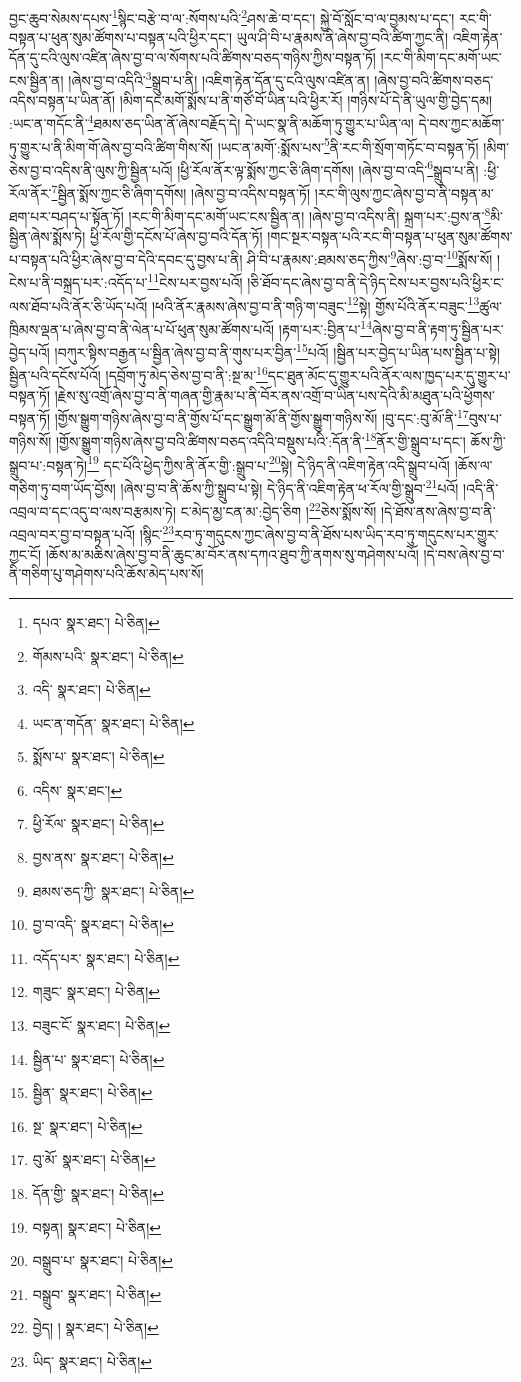 བྱང་ཆུབ་སེམས་དཔས་\footnote{དཔའ་  སྣར་ཐང་།  པེ་ཅིན། }སྙིང་བརྩེ་བ་ལ་:སོགས་པའི་\footnote{གོམས་པའི་  སྣར་ཐང་།  པེ་ཅིན། }ཤས་ཆེ་བ་དང་། སྐྱེ་བོ་སློང་བ་ལ་བྱམས་པ་དང་། རང་གི་བསྟན་པ་ཕུན་སུམ་ཚོགས་པ་བསྟན་པའི་ཕྱིར་དང་། ཡུལ་ཤི་བི་པ་རྣམས་ནི་ཞེས་བྱ་བའི་ཚིག་ཀྱང་ནི། འཇིག་རྟེན་དོན་དུ་ངའི་ལུས་འཛིན་ཞེས་བྱ་བ་ལ་སོགས་པའི་ཚིགས་བཅད་གཉིས་ཀྱིས་བསྟན་ཏོ། །རང་གི་མིག་དང་མགོ་ཡང་ངས་སྦྱིན་ན། །ཞེས་བྱ་བ་འདིའི་\footnote{འདི་  སྣར་ཐང་།  པེ་ཅིན། }སྒྲུབ་པ་ནི། །འཇིག་རྟེན་དོན་དུ་ངའི་ལུས་འཛིན་ན། །ཞེས་བྱ་བའི་ཚིགས་བཅད་འདིས་བསྟན་པ་ཡིན་ནོ། །མིག་དང་མགོ་སྨོས་པ་ནི་གཙོ་བོ་ཡིན་པའི་ཕྱིར་རོ། །གཉིས་པོ་དེ་ནི་ཡུལ་གྱི་བྱེད་དམ། :ཡང་ན་གདོང་ནི་\footnote{ཡང་ན་གདོན་  སྣར་ཐང་།  པེ་ཅིན། }ཐམས་ཅད་ཡིན་ནོ་ཞེས་བརྗོད་དེ། དེ་ཡང་སྣ་ནི་མཆོག་ཏུ་གྱུར་པ་ཡིན་ལ། དེ་བས་ཀྱང་མཆོག་ཏུ་གྱུར་པ་ནི་མིག་གོ་ཞེས་བྱ་བའི་ཚིག་གིས་སོ། །ཡང་ན་མགོ་:སྨོས་པས་\footnote{སྨོས་པ་  སྣར་ཐང་།  པེ་ཅིན། }ནི་རང་གི་སྲོག་གཏོང་བ་བསྟན་ཏོ། །མིག་ཅེས་བྱ་བ་འདིས་ནི་ལུས་ཀྱི་སྦྱིན་པའོ། །ཕྱི་རོལ་ནོར་ལྟ་སྨོས་ཀྱང་ཅི་ཞིག་དགོས། །ཞེས་བྱ་བ་འདི་\footnote{འདིས་  སྣར་ཐང་། }སྒྲུབ་པ་ནི། :ཕྱི་རོལ་ནོར་\footnote{ཕྱི་རོལ་  སྣར་ཐང་།  པེ་ཅིན། }སྦྱིན་སྨོས་ཀྱང་ཅི་ཞིག་དགོས། །ཞེས་བྱ་བ་འདིས་བསྟན་ཏོ། །རང་གི་ལུས་ཀྱང་ཞེས་བྱ་བ་ནི་བསྟན་མ་ཐག་པར་བཤད་པ་སྟོན་ཏོ། །རང་གི་མིག་དང་མགོ་ཡང་ངས་སྦྱིན་ན། །ཞེས་བྱ་བ་འདིས་ནི། སྐྲག་པར་:བྱས་ན་\footnote{བྱས་ནས་  སྣར་ཐང་།  པེ་ཅིན། }མི་སྦྱིན་ཞེས་སྨོས་ཏེ། ཕྱི་རོལ་གྱི་དངོས་པོ་ཞེས་བྱ་བའི་དོན་ཏོ། །གང་སྔར་བསྟན་པའི་རང་གི་བསྟན་པ་ཕུན་སུམ་ཚོགས་པ་བསྟན་པའི་ཕྱིར་ཞེས་བྱ་བ་དེའི་དབང་དུ་བྱས་པ་ནི། ཤི་བི་པ་རྣམས་:ཐམས་ཅད་ཀྱིས་\footnote{ཐམས་ཅད་ཀྱི་  སྣར་ཐང་།  པེ་ཅིན། }ཞེས་:བྱ་བ་\footnote{བྱ་བ་འདི་  སྣར་ཐང་།  པེ་ཅིན། }སྨོས་སོ། །ངེས་པ་ནི་བསྐྲད་པར་:འདོད་པ་\footnote{འདོད་པར་  སྣར་ཐང་།  པེ་ཅིན། }ངེས་པར་བྱས་པའོ། །ཅི་ཐོབ་དང་ཞེས་བྱ་བ་ནི་དེ་ཉིད་ངེས་པར་བྱས་པའི་ཕྱིར་ང་ལས་ཐོབ་པའི་ནོར་ཅི་ཡོད་པའོ། །ཕའི་ནོར་རྣམས་ཞེས་བྱ་བ་ནི་གཉི་ག་བཟུང་\footnote{གཟུང་  སྣར་ཐང་།  པེ་ཅིན། }སྟེ། གྱོས་པོའི་ནོར་བཟུང་\footnote{བཟུང་ངོ་  སྣར་ཐང་།  པེ་ཅིན། }ཚུལ་ཁྲིམས་ལྡན་པ་ཞེས་བྱ་བ་ནི་ལེན་པ་པོ་ཕུན་སུམ་ཚོགས་པའོ། །རྟག་པར་:བྱིན་པ་\footnote{སྦྱིན་པ་  སྣར་ཐང་།  པེ་ཅིན། }ཞེས་བྱ་བ་ནི་རྟག་ཏུ་སྦྱིན་པར་བྱེད་པའོ། །བཀུར་སྟིས་བརྒྱན་པ་སྦྱིན་ཞེས་བྱ་བ་ནི་གུས་པར་བྱིན་\footnote{སྦྱིན་  སྣར་ཐང་།  པེ་ཅིན། }པའོ། །སྦྱིན་པར་བྱེད་པ་ཡིན་པས་སྦྱིན་པ་སྟེ། སྦྱིན་པའི་དངོས་པོའོ། །དབྲོག་ཏུ་མེད་ཅེས་བྱ་བ་ནི་:སྔ་མ་\footnote{སྔ་  སྣར་ཐང་།  པེ་ཅིན། }དང་ཐུན་མོང་དུ་གྱུར་པའི་ནོར་ལས་ཁྱད་པར་དུ་གྱུར་པ་བསྟན་ཏོ། །རྗེས་སུ་འགྲོ་ཞེས་བྱ་བ་ནི་གཞན་གྱི་རྣམ་པ་ནི་བོར་ནས་འགྲོ་བ་ཡིན་པས་དེའི་མི་མཐུན་པའི་ཕྱོགས་བསྟན་ཏོ། །གྱོས་སྒྱུག་གཉིས་ཞེས་བྱ་བ་ནི་གྱོས་པོ་དང་སྒྱུག་མོ་ནི་གྱོས་སྒྱུག་གཉིས་སོ། །བུ་དང་:བུ་མོ་ནི་\footnote{བུ་མོ་  སྣར་ཐང་།  པེ་ཅིན། }བུས་པ་གཉིས་སོ། །གྱོས་སྒྱུག་གཉིས་ཞེས་བྱ་བའི་ཚིགས་བཅད་འདིའི་བསྡུས་པའི་:དོན་ནི་\footnote{དོན་གྱི་  སྣར་ཐང་།  པེ་ཅིན། }ནོར་གྱི་སྒྲུབ་པ་དང་། ཆོས་ཀྱི་སྒྲུབ་པ་:བསྟན་ཏེ།\footnote{བསྟན།  སྣར་ཐང་།  པེ་ཅིན། } དང་པོའི་ཕྱེད་ཀྱིས་ནི་ནོར་གྱི་:སྒྲུབ་པ་\footnote{བསྒྲུབ་པ་  སྣར་ཐང་།  པེ་ཅིན། }སྟེ། དེ་ཉིད་ནི་འཇིག་རྟེན་འདི་སྒྲུབ་པའོ། །ཆོས་ལ་གཅིག་ཏུ་བག་ཡོད་བྱོས། །ཞེས་བྱ་བ་ནི་ཆོས་ཀྱི་སྒྲུབ་པ་སྟེ། དེ་ཉིད་ནི་འཇིག་རྟེན་ཕ་རོལ་གྱི་སྒྲུབ་\footnote{བསྒྲུབ་  སྣར་ཐང་།  པེ་ཅིན། }པའོ། །འདི་ནི་འབྲལ་བ་དང་འདུ་བ་ལས་བརྩམས་ཏེ། ང་མེད་མྱ་ངན་མ་:བྱེད་ཅིག །\footnote{བྱེད། །  སྣར་ཐང་།  པེ་ཅིན། }ཅེས་སྨོས་སོ། །དེ་ཐོས་ནས་ཞེས་བྱ་བ་ནི་འབྲལ་བར་བྱ་བ་བསྟན་པའོ། །སྙིང་\footnote{ཡིད་  སྣར་ཐང་།  པེ་ཅིན། }རབ་ཏུ་གདུངས་ཀྱང་ཞེས་བྱ་བ་ནི་ཐོས་པས་ཡིད་རབ་ཏུ་གདུངས་པར་གྱུར་ཀྱང་ངོ། །ཆོས་མ་མཆིས་ཞེས་བྱ་བ་ནི་ཆུང་མ་བོར་ནས་དཀའ་ཐུབ་ཀྱི་ནགས་སུ་གཤེགས་པའོ། །དེ་བས་ཞེས་བྱ་བ་ནི་གཅིག་པུ་གཤེགས་པའི་ཆོས་མེད་པས་སོ། 